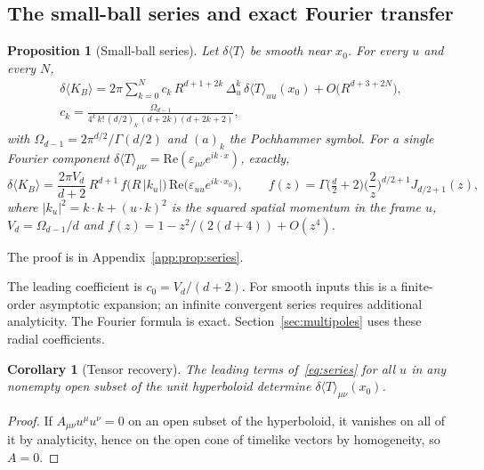 \documentclass[12pt]{article}
\newtheorem{proposition}[theorem]{Proposition}
\newtheorem{corollary}[theorem]{Corollary}
\theoremstyle{definition}
\theoremstyle{remark}
\newcommand{\dT}{\delta\langle T\rangle}
\newcommand{\ev}[1]{\langle #1\rangle}
\begin{document}
\subsection{The small-ball series and exact Fourier transfer}\label{subsec:series}

\begin{proposition}[Small-ball series]\label{prop:series}
Let \(\dT\) be smooth near \(x_0\). For every \(u\) and every \(N\),
\begin{equation}\label{eq:series}
\begin{gathered}
\delta\ev{K_B}=2\pi\sum_{k=0}^{N}c_k\,R^{d+1+2k}\,\Delta_u^k\,\dT_{uu}(x_0)
+O\big(R^{d+3+2N}\big),\\
c_k=\frac{\Omega_{d-1}}{4^k\,k!\,(d/2)_k\,(d+2k)(d+2k+2)},
\end{gathered}
\end{equation}
with \(\Omega_{d-1}=2\pi^{d/2}/\Gamma(d/2)\) and \((a)_k\) the Pochhammer symbol. For a
single Fourier component \(\dT_{\mu\nu}=\mathrm{Re}(\varepsilon_{\mu\nu}e^{ik\cdot x})\),
exactly,
\begin{equation}\label{eq:transfer}
\delta\ev{K_B}=\frac{2\pi V_d}{d+2}\,R^{d+1}\,f\big(R\,|k_u|\big)\,
\mathrm{Re}\big(\varepsilon_{uu}e^{ik\cdot x_0}\big),\qquad
f(z)=\Gamma\!\big(\tfrac d2+2\big)\Big(\frac2z\Big)^{d/2+1}J_{d/2+1}(z),
\end{equation}
where \(|k_u|^2=k\cdot k+(u\cdot k)^2\) is the squared spatial momentum in the frame \(u\),
\(V_d=\Omega_{d-1}/d\) and \(f(z)=1-z^2/(2(d+4))+O(z^4)\).
\end{proposition}

The proof is in Appendix~\ref{app:prop:series}.


The leading coefficient is \(c_0=V_d/(d+2)\). For smooth inputs this is
a finite-order asymptotic expansion; an infinite convergent series requires
additional analyticity. The Fourier formula is exact.
Section~\ref{sec:multipoles} uses these radial coefficients.

\begin{corollary}[Tensor recovery]\label{cor:recovery}
The leading terms of~\eqref{eq:series} for all \(u\) in any nonempty open subset of the unit
hyperboloid determine \(\dT_{\mu\nu}(x_0)\).
\end{corollary}

\begin{proof}
If \(A_{\mu\nu}u^\mu u^\nu=0\) on an open subset of the hyperboloid, it vanishes on all of
it by analyticity, hence on the open cone of timelike vectors by homogeneity, so \(A=0\).
\end{proof}
\end{document}
